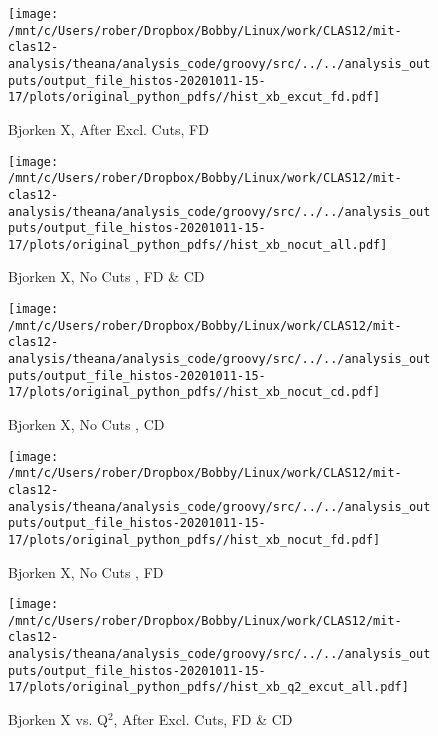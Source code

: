 \documentclass{article}
\begin{document}
\begin{landscape}
    \begin{figure}[h]
        \centering

        \texttt{[image: /mnt/c/Users/rober/Dropbox/Bobby/Linux/work/CLAS12/mit-clas12-analysis/theana/analysis\_code/groovy/src/../../analysis\_outputs/output\_file\_histos-20201011-15-17/plots/original\_python\_pdfs//hist\_xb\_excut\_fd.pdf]}
        \captionsetup{textformat=empty,labelformat=blank}
        \caption{Bjorken X, After Excl. Cuts, FD}
    \end{figure}
    \clearpage
    
    \begin{figure}[h]
        \centering

        \texttt{[image: /mnt/c/Users/rober/Dropbox/Bobby/Linux/work/CLAS12/mit-clas12-analysis/theana/analysis\_code/groovy/src/../../analysis\_outputs/output\_file\_histos-20201011-15-17/plots/original\_python\_pdfs//hist\_xb\_nocut\_all.pdf]}
        \captionsetup{textformat=empty,labelformat=blank}
        \caption{Bjorken X, No Cuts , FD \& CD}
    \end{figure}
    \clearpage
    
    \begin{figure}[h]
        \centering

        \texttt{[image: /mnt/c/Users/rober/Dropbox/Bobby/Linux/work/CLAS12/mit-clas12-analysis/theana/analysis\_code/groovy/src/../../analysis\_outputs/output\_file\_histos-20201011-15-17/plots/original\_python\_pdfs//hist\_xb\_nocut\_cd.pdf]}
        \captionsetup{textformat=empty,labelformat=blank}
        \caption{Bjorken X, No Cuts , CD}
    \end{figure}
    \clearpage
    
    \begin{figure}[h]
        \centering

        \texttt{[image: /mnt/c/Users/rober/Dropbox/Bobby/Linux/work/CLAS12/mit-clas12-analysis/theana/analysis\_code/groovy/src/../../analysis\_outputs/output\_file\_histos-20201011-15-17/plots/original\_python\_pdfs//hist\_xb\_nocut\_fd.pdf]}
        \captionsetup{textformat=empty,labelformat=blank}
        \caption{Bjorken X, No Cuts , FD}
    \end{figure}
    \clearpage
    
    \begin{figure}[h]
        \centering

        \texttt{[image: /mnt/c/Users/rober/Dropbox/Bobby/Linux/work/CLAS12/mit-clas12-analysis/theana/analysis\_code/groovy/src/../../analysis\_outputs/output\_file\_histos-20201011-15-17/plots/original\_python\_pdfs//hist\_xb\_q2\_excut\_all.pdf]}
        \captionsetup{textformat=empty,labelformat=blank}
        \caption{Bjorken X vs. Q$^{2}$, After Excl. Cuts, FD \& CD}
    \end{figure}
    \clearpage
    

\end{landscape}
\end{document}
